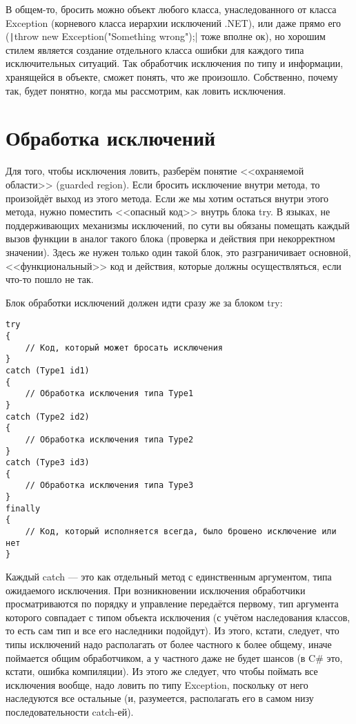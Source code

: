 \documentclass[a5paper]{article}
\begin{document}
В общем-то, бросить можно объект любого класса, унаследованного от класса Exception (корневого класса иерархии исключений .NET), или даже прямо его (\texttt|throw new Exception("Something wrong");| тоже вполне ок), но хорошим стилем является создание отдельного класса ошибки для каждого типа исключительных ситуаций. Так обработчик исключения по типу и информации, хранящейся в объекте, сможет понять, что же произошло. Собственно, почему так, будет понятно, когда мы рассмотрим, как ловить исключения. 

\section{Обработка исключений}

Для того, чтобы исключения ловить, разберём понятие <<охраняемой области>> (guarded region). Если бросить исключение внутри метода, то произойдёт выход из этого метода. Если же мы хотим остаться внутри этого метода, нужно поместить <<опасный код>> внутрь блока try. В языках, не поддерживающих механизмы исключений, по сути вы обязаны помещать каждый вызов функции в аналог такого блока (проверка и действия при некорректном значении). Здесь же нужен только один такой блок, это разграничивает основной, <<функциональный>> код и действия, которые должны осуществляться, если что-то пошло не так.

Блок обработки исключений должен идти сразу же за блоком try:

\begin{verbatim}
try
{
    // Код, который может бросать исключения
}
catch (Type1 id1)
{
    // Обработка исключения типа Type1
}
catch (Type2 id2)
{
    // Обработка исключения типа Type2
}
catch (Type3 id3)
{
    // Обработка исключения типа Type3
}
finally
{
    // Код, который исполняется всегда, было брошено исключение или нет
}
\end{verbatim}

Каждый catch --- это как отдельный метод с единственным аргументом, типа ожидаемого исключения. При возникновении исключения обработчики просматриваются по порядку и управление передаётся первому, тип аргумента которого совпадает с типом объекта исключения (с учётом наследования классов, то есть сам тип и все его наследники подойдут). Из этого, кстати, следует, что типы исключений надо располагать от более частного к более общему, иначе поймается общим обработчиком, а у частного даже не будет шансов (в C\# это, кстати, ошибка компиляции). Из этого же следует, что чтобы поймать все исключения вообще, надо ловить по типу Exception, поскольку от него наследуются все остальные (и, разумеется, располагать его в самом низу последовательности catch-ей).
\end{document}
